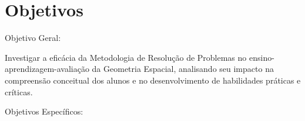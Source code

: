 \section{Objetivos}

Objetivo Geral:

Investigar a eficácia da Metodologia de Resolução de Problemas no ensino-aprendizagem-avaliação da Geometria Espacial, analisando seu impacto na compreensão conceitual dos alunos e no desenvolvimento de habilidades práticas e críticas.

Objetivos Específicos:

\begin{enumerate}


\end{enumerate}
